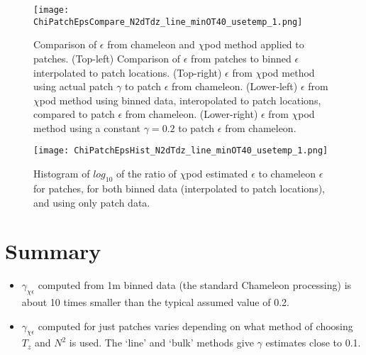 \documentclass[11pt]{article}
\begin{document}
\begin{figure}[htbp]
\texttt{[image: ChiPatchEpsCompare\_N2dTdz\_line\_minOT40\_usetemp\_1.png]}
\caption{Comparison of $\epsilon$ from chameleon and $\chi$pod method applied to patches. (Top-left) Comparison of $\epsilon$ from patches to binned $\epsilon$ interpolated to patch locations. (Top-right) $\epsilon$ from $\chi$pod method using actual patch $\gamma$ to patch $\epsilon$ from chameleon. (Lower-left) $\epsilon$ from $\chi$pod method using binned data, interopolated to patch locations, compared to patch $\epsilon$ from chameleon. (Lower-right) $\epsilon$ from $\chi$pod method using a constant $\gamma=0.2$ to patch $\epsilon$ from chameleon.}
\label{epscomp2d}
\end{figure}


\begin{figure}[htbp]
\texttt{[image: ChiPatchEpsHist\_N2dTdz\_line\_minOT40\_usetemp\_1.png]}
\caption{Histogram of $log_{10}$ of the ratio of $\chi$pod estimated $\epsilon$ to chameleon $\epsilon$ for patches, for both binned data (interpolated to patch locations), and using only patch data.}
\label{epscomphist}
\end{figure}





\clearpage
\section{Summary}

\begin{itemize}
\item $\gamma_{\chi\epsilon}$ computed from 1m binned data (the standard Chameleon processing) is about 10 times smaller than the typical assumed value of 0.2.
\item $\gamma_{\chi\epsilon}$ computed for just patches varies depending on what method of choosing $T_z$ and $N^2$ is used. The `line' and `bulk' methods give $\gamma$ estimates close to 0.1. 
\end{itemize}
\end{document}
